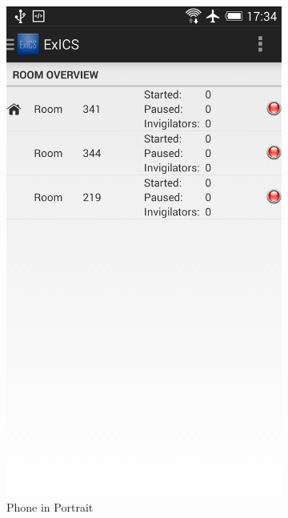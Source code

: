 \begin{figure}[h]
	\centering
	\begin{subfigure}[b]{0.35\textwidth}
		\includegraphics[width=\textwidth]{"screenshots/phone_portrait_room_list"}
		\caption{Phone in Portrait}
		\label{subfig:phone_portrait}
	\end{subfigure}
	\begin{subfigure}[b]{0.35\textwidth}

\end{subfigure}
\end{figure}
